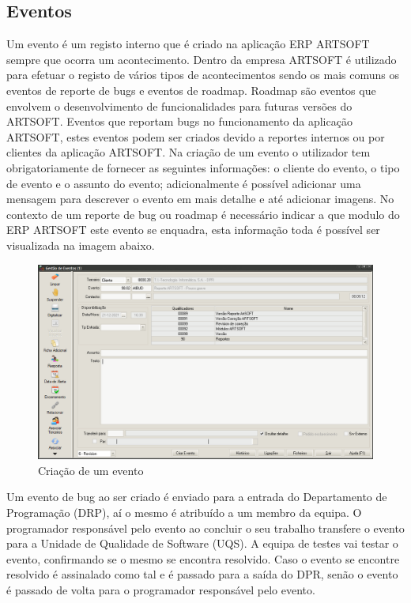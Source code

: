 \documentclass[sigplan]{acmart}
\begin{document}

\subsection{Eventos}

Um evento é um registo interno que é criado na aplicação ERP ARTSOFT sempre que ocorra um acontecimento. Dentro da empresa ARTSOFT é utilizado para efetuar o registo de vários tipos de acontecimentos sendo os mais comuns os eventos de reporte de bugs e eventos de roadmap. Roadmap são eventos que envolvem o desenvolvimento de funcionalidades para futuras versões do ARTSOFT. Eventos que reportam bugs no funcionamento da aplicação ARTSOFT, estes eventos podem ser criados devido a reportes internos ou por clientes da aplicação ARTSOFT. Na criação de um evento o utilizador tem obrigatoriamente de fornecer as seguintes informações: o cliente do evento, o tipo de evento e o assunto do evento; adicionalmente é possível adicionar uma mensagem para descrever o evento em mais detalhe e até adicionar imagens. No contexto de um reporte de bug ou roadmap é necessário indicar a que modulo do ERP ARTSOFT este evento se enquadra, esta informação toda é possível ser visualizada na imagem abaixo.
\FloatBarrier
\begin{figure}[htbp]
	\centerline{\includegraphics[width=\linewidth]{figures/evento_criacao.png}}
	\caption{Criação de um evento}
	\label{fig1}
\end{figure}
\FloatBarrier
Um evento de bug ao ser criado é enviado para a entrada do Departamento de Programação (DRP), aí o mesmo é atribuído a um membro da equipa. O programador responsável pelo evento ao concluir o seu trabalho transfere o evento para a Unidade de Qualidade de Software (UQS). A equipa de testes vai testar o evento, confirmando se o mesmo se encontra resolvido. Caso o evento se encontre resolvido é assinalado como tal e é passado para a saída do DPR, senão o evento é passado de volta para o programador responsável pelo evento.
\end{document}
